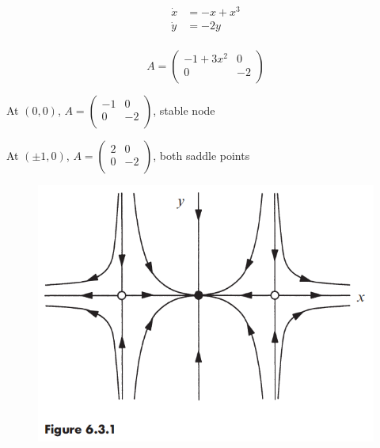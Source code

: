 \documentclass[10pt,aspectratio=43,mathserif,table]{beamer}
\begin{document}
\begin{frame}
    $$
    \begin{aligned}
        \dot{x}&=-x+x^3\\
        \dot{y}&=-2y\\
    \end{aligned}
    $$

    $$
    A=\left( \begin{matrix}
        -1+3x^2&		0\\
        0&		-2\\
    \end{matrix} \right) 
    $$

    At $(0, 0)$, 
    $A=\left( \begin{matrix}
        -1&		0\\
        0&		-2\\
    \end{matrix} \right) $, stable node

    At $(\pm 1, 0)$,
    $A=\left( \begin{matrix}
        2&		0\\
        0&		-2\\
    \end{matrix} \right) $, both saddle points

    \begin{figure}
        \centering
        \includegraphics[width=0.5\linewidth]{f631.jpg}
    \end{figure}
\end{frame}
\end{document}

